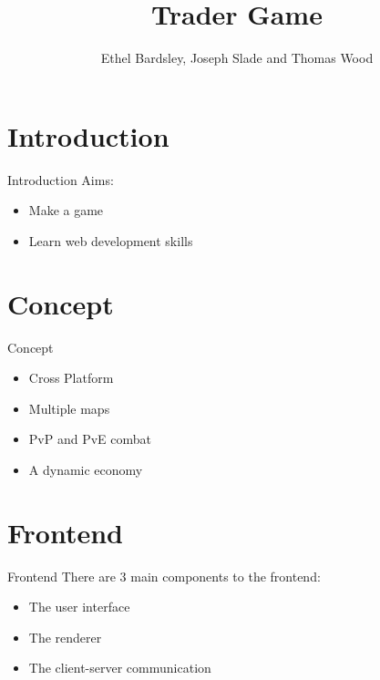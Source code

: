 
\usepackage{algorithm2e}
\usepackage{graphicx}
\usepackage[parfill]{parskip}
\usepackage{appendix}
\usepackage{amsmath}
\usepackage{multicol}
\usepackage{relsize}
\usepackage{verbatim}

\title{Trader Game}
\author{Ethel Bardsley, Joseph Slade and Thomas Wood}



\begin{frame}
  \titlepage
\end{frame}

\section{Introduction}
\begin{frame}{Introduction}
  Aims:
    \begin{itemize}
      \item Make a game
      \item Learn web development skills
    \end{itemize}
\end{frame}

\section{Concept}
\begin{frame}{Concept}
  \begin{itemize}
    \item Cross Platform
    \item Multiple maps
    \item PvP and PvE combat
    \item A dynamic economy
  \end{itemize}
\end{frame}

\section{Frontend}
\begin{frame}{Frontend}
  There are 3 main components to the frontend:
  \begin{itemize}
    \item The user interface
    \item The renderer
    \item The client-server communication
  \end{itemize}
\end{frame}

